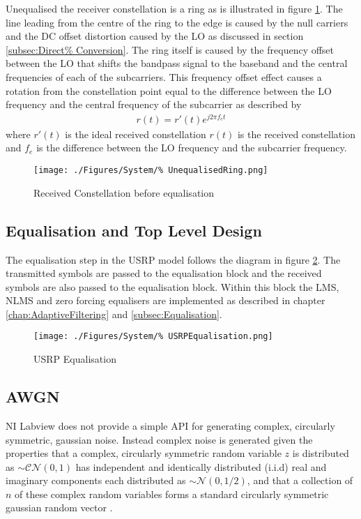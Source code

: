 Unequalised the receiver constellation is a ring as is %
illustrated in figure \ref{fig:ReceivedRing}. The line %
leading from the centre of the ring to the edge is %
caused by the null carriers and the DC offset distortion %
caused by the LO as discussed in section \ref{subsec:Direct%
Conversion}. The ring itself is caused by the frequency offset %
between the LO that shifts the bandpass signal to the baseband %
and the central frequencies of each of the subcarriers. This %
frequency offset effect causes a rotation from the constellation %
point equal to the difference between the LO frequency and the %
central frequency of the subcarrier as described by 
\begin{align}
	r(t) = r'(t)e^{j 2\pi f_{e}t}
\end{align}
where $r'(t)$ is the ideal received constellation $r(t)$ is %
the received constellation and $f_{e}$ is the difference %
between the LO frequency and the subcarrier frequency.
\begin{figure}[ht]
	\centering
	\texttt{[image: ./Figures/System/\%
	UnequalisedRing.png]}
	\caption{Received Constellation before equalisation}
	\label{fig:ReceivedRing}
\end{figure}
\FloatBarrier
\subsection{Equalisation and Top Level Design}
The equalisation step in the USRP model follows %
the diagram in figure \ref{fig:USRPEqualisation}. The transmitted %
symbols are passed to the equalisation block and the received %
symbols are also passed to the equalisation block. Within this block %
the LMS, NLMS and zero forcing equalisers are implemented as %
described in chapter \ref{chap:AdaptiveFiltering} and %
\ref{subsec:Equalisation}.
\begin{figure}[ht]
	\centering
	\texttt{[image: ./Figures/System/\%
	USRPEqualisation.png]}
	\caption{USRP Equalisation}
	\label{fig:USRPEqualisation}
\end{figure}
\subsection{AWGN}
NI Labview does not provide a simple API for generating %
complex, circularly symmetric, gaussian noise. Instead %
complex noise is generated given the properties that %
a complex, circularly symmetric random variable $z$ is %
distributed as $\sim\mathcal{CN}(0,1)$ has independent %
and identically distributed (i.i.d) real and imaginary %
components each distributed as $\sim\mathcal{N}(0,1/2)$, %
and that a collection of $n$ of these complex random %
variables forms a standard circularly symmetric %
gaussian random vector \cite{Tse05}.

